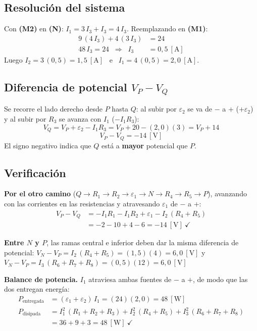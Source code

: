 \documentclass[12pt,letterpaper]{article}
\begin{document}
\subsection*{Resoluci\'on del sistema}

Con \textbf{(M2)} en \textbf{(N)}: $I_1 = 3\,I_3 + I_3 = 4\,I_3$. Reemplazando en \textbf{(M1)}:
\begin{align*}
    9\,(4\,I_3) + 4\,(3\,I_3) &= 24\\[2pt]
    48\,I_3 = 24 \;\;\Rightarrow\;\; I_3 &= 0{,}5\ [\text{A}]
\end{align*}
Luego $I_2 = 3\,(0{,}5) = 1{,}5\ [\text{A}]$ \ e \ $I_1 = 4\,(0{,}5) = 2{,}0\ [\text{A}]$.

\subsection*{Diferencia de potencial $V_P - V_Q$}

Se recorre el lado derecho desde $P$ hasta $Q$: al subir por $\varepsilon_2$ se va de $-$ a $+$
($+\varepsilon_2$) y al subir por $R_3$ se avanza con $I_1$ ($-I_1R_3$):
\[
    V_Q = V_P + \varepsilon_2 - I_1R_3 = V_P + 20 - (2{,}0)(3) = V_P + 14
\]
\[
    \boxed{V_P - V_Q = -14\ [\text{V}]}
\]
El signo negativo indica que $Q$ est\'a a \textbf{mayor} potencial que $P$.

\subsection*{Verificaci\'on}

\textbf{Por el otro camino} ($Q\to R_1\to R_2\to\varepsilon_1\to N\to R_4\to R_5\to P$), avanzando
con las corrientes en las resistencias y atravesando $\varepsilon_1$ de $-$ a $+$:
\begin{align*}
    V_P - V_Q &= -I_1R_1 - I_1R_2 + \varepsilon_1 - I_2\,(R_4+R_5)\\[2pt]
              &= -2 - 10 + 4 - 6 = -14\ [\text{V}]\ \checkmark
\end{align*}

\textbf{Entre $N$ y $P$}, las ramas central e inferior deben dar la misma diferencia de potencial:
$V_N - V_P = I_2\,(R_4+R_5) = (1{,}5)(4) = 6{,}0\ [\text{V}]$ y
$V_N - V_P = I_3\,(R_6+R_7+R_8) = (0{,}5)(12) = 6{,}0\ [\text{V}]$ \checkmark

\medskip
\textbf{Balance de potencia.} $I_1$ atraviesa ambas fuentes de $-$ a $+$, de modo que las dos
entregan energ\'ia:
\begin{align*}
    P_{\text{entregada}} &= (\varepsilon_1 + \varepsilon_2)\,I_1 = (24)(2{,}0) = 48\ [\text{W}]\\[2pt]
    P_{\text{disipada}}  &= I_1^2\,(R_1+R_2+R_3) + I_2^2\,(R_4+R_5) + I_3^2\,(R_6+R_7+R_8)\\
                         &= 36 + 9 + 3 = 48\ [\text{W}]\ \checkmark
\end{align*}
\end{document}
